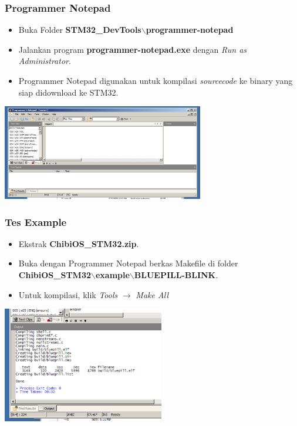 \documentclass[table,dvipsnames]{beamer}
\begin{document}
	\begin{frame}
		\frametitle{Programmer Notepad}
		\begin{exampleblock}{}
			\begin{itemize}
				\item Buka Folder \textbf{STM32\_DevTools$\backslash$programmer-notepad}
				\item Jalankan program \textbf{programmer-notepad.exe} dengan \textit{Run as Administrator}.
				\item Programmer Notepad digunakan untuk kompilasi \textit{sourcecode} ke binary yang siap didownload ke STM32.
			\end{itemize}
		\end{exampleblock}

		\begin{center}
			\includegraphics[width=250pt]{images/pn}
		\end{center}
	\end{frame}

	\begin{frame}
	\frametitle{Tes Example}
	\begin{exampleblock}{}
		\begin{itemize}
			\item Ekstrak \textbf{ChibiOS\_STM32.zip}.
			\item Buka dengan Programmer Notepad berkas Makefile di folder \textbf{ChibiOS\_STM32$\backslash$example$\backslash$BLUEPILL-BLINK}.
			\item Untuk kompilasi, klik \textit{Tools} $\rightarrow$ \textit{Make All}
		\end{itemize}
	\end{exampleblock}

	\begin{center}
		\includegraphics[width=200pt]{images/compile}
	\end{center}
	\end{frame}
\end{document}
